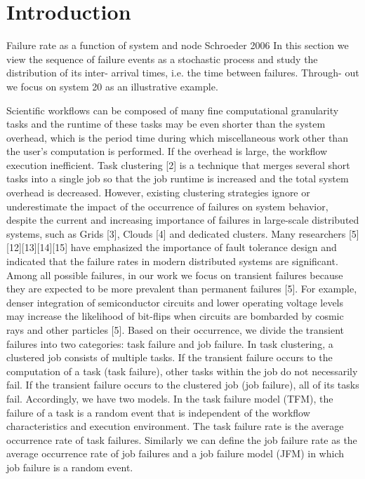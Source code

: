 \documentclass{IOS-Book-Article}
\begin{document}
\section*{Introduction}

Failure rate as a function of system and node Schroeder 2006
In this section we view the sequence of failure events as a stochastic process and study the distribution of its inter- arrival times, i.e. the time between failures. Through- out we focus on system 20 as an illustrative example.


Scientific workflows can be composed of many fine computational granularity tasks and the runtime of these tasks may be even shorter than the system overhead, which is the period time during which miscellaneous work other than the user’s computation is performed. If the overhead is large, the workflow execution inefficient. Task clustering [2] is a technique that merges several short tasks into a single job so that the job runtime is increased and the total system overhead is decreased. However, existing clustering strategies ignore or underestimate the impact of the occurrence of failures on system behavior, despite the current and increasing importance of failures in large-scale distributed systems, such as Grids [3], Clouds [4] and dedicated clusters. Many researchers [5][12][13][14][15] have emphasized the importance of fault tolerance design and indicated that the failure rates in modern distributed systems are significant. Among all possible failures, in our work we focus on transient failures because they are expected to be more prevalent than permanent failures [5]. For example, denser integration of semiconductor circuits and lower operating voltage levels may increase the likelihood of bit-flips when circuits are bombarded by cosmic rays and other particles [5]. Based on their occurrence, we divide the transient failures into two categories: task failure and job failure. In task clustering, a clustered job consists of multiple tasks. If the transient failure occurs to the computation of a task (task failure), other tasks within the job do not necessarily fail. If the transient failure occurs to the clustered job (job failure), all of its tasks fail. Accordingly, we have two models. In the task failure model (TFM), the failure of a task is a random event that is independent of the workflow characteristics and execution environment. The task failure rate is the average occurrence rate of task failures. Similarly we can define the job failure rate as the average occurrence rate of job failures and a job failure model (JFM) in which job failure is a random event. 
\end{document}
